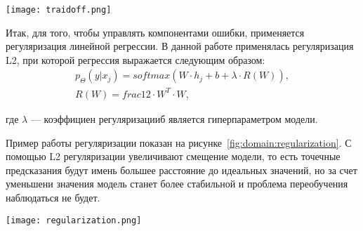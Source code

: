 \begin{center}
  \texttt{[image: traidoff.png]}
  \label{fig:domain:traidoff}
\end{center}

Итак, для того, чтобы управлять компонентами ошибки, применяется регуляризация линейной регрессии. В данной работе применялась регуляризация L2, при которой регрессия выражается следующим образом:
\begin{gather}
  p_{\Theta}(y|x_j) = softmax(W\cdot{h_j} + b + \lambda\cdot{R(W)}),\\
  R(W) = frac{1}{2}\cdot{W^T}\cdot{W},
\end{gather}
\begin{explanationx}
\item[где] $\lambda$ --- коэффициен регуляризацииб является гиперпараметром модели.
\end{explanationx}

Пример работы регуляризации показан на рисунке~\ref{fig:domain:regularization}. С помощью L2 регуляризации увеличивают смещение модели, то есть точечные предсказания будут имень большее расстояние до идеальных значений, но за счет  уменьшени значения модель станет более стабильной и проблема переобучения наблюдаться не будет.

\begin{center}
  \texttt{[image: regularization.png]}
  \label{fig:domain:regularization}
\end{center}